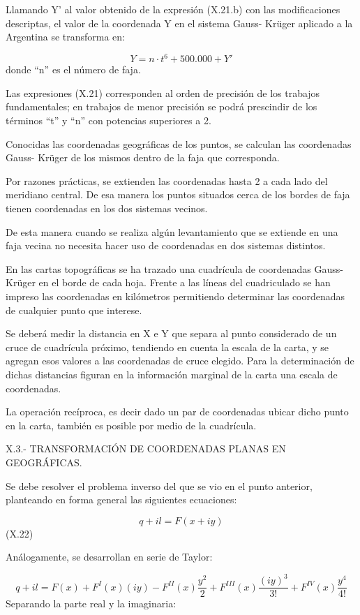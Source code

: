 \documentclass[]{article}
\begin{document}
Llamando Y' al valor obtenido de la expresión (X.21.b) con las
modificaciones descriptas, el valor de la coordenada Y en el sistema
Gauss- Krüger aplicado a la Argentina se transforma en:

\[Y=n\cdot t^6+\text{500}\text{.}\text{000}+Y'\] donde ``n'' es el
número de faja.

Las expresiones (X.21) corresponden al orden de precisión de los
trabajos fundamentales; en trabajos de menor precisión se podrá
prescindir de los términos ``t'' y ``n'' con potencias superiores a 2.

Conocidas las coordenadas geográficas de los puntos, se calculan las
coordenadas Gauss- Krüger de los mismos dentro de la faja que
corresponda.

Por razones prácticas, se extienden las coordenadas hasta 2 a cada lado
del meridiano central. De esa manera los puntos situados cerca de los
bordes de faja tienen coordenadas en los dos sistemas vecinos.

De esta manera cuando se realiza algún levantamiento que se extiende en
una faja vecina no necesita hacer uso de coordenadas en dos sistemas
distintos.

En las cartas topográficas se ha trazado una cuadrícula de coordenadas
Gauss- Krüger en el borde de cada hoja. Frente a las líneas del
cuadriculado se han impreso las coordenadas en kilómetros permitiendo
determinar las coordenadas de cualquier punto que interese.

Se deberá medir la distancia en X e Y que separa al punto considerado de
un cruce de cuadrícula próximo, tendiendo en cuenta la escala de la
carta, y se agregan esos valores a las coordenadas de cruce elegido.
Para la determinación de dichas distancias figuran en la información
marginal de la carta una escala de coordenadas.

La operación recíproca, es decir dado un par de coordenadas ubicar dicho
punto en la carta, también es posible por medio de la cuadrícula.

X.3.- TRANSFORMACIÓN DE COORDENADAS PLANAS EN GEOGRÁFICAS.

Se debe resolver el problema inverso del que se vio en el punto
anterior, planteando en forma general las siguientes ecuaciones:

\[q+il=F\left(x+iy\right)\] (X.22)

Análogamente, se desarrollan en serie de Taylor:

\[q+il=F\left(x\right)+F^I\left(x\right)\left(iy\right)-F^{II}\left(x\right)\frac{y^2}{2}+F^{III}\left(x\right)\frac{\left(iy\right)^3}{3!}+F^{IV}\left(x\right)\frac{y^4}{4!}\]
Separando la parte real y la imaginaria:
\end{document}
